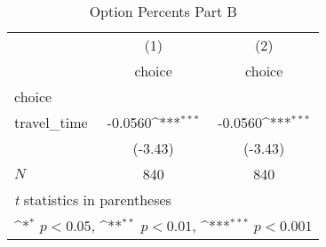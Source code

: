 \begin{table}[htbp]\centering
\def\sym#1{\ifmmode^{#1}\else\(^{#1}\)\fi}
\caption{Option Percents Part B}
\begin{tabular}{l*{2}{c}}
\hline\hline
            &\multicolumn{1}{c}{(1)}&\multicolumn{1}{c}{(2)}\\
            &\multicolumn{1}{c}{choice}&\multicolumn{1}{c}{choice}\\
\hline
choice      &                     &                     \\
travel\_time &     -0.0560\sym{***}&     -0.0560\sym{***}\\
            &     (-3.43)         &     (-3.43)         \\
\hline
\(N\)       &         840         &         840         \\
\hline\hline
\multicolumn{3}{l}{\footnotesize \textit{t} statistics in parentheses}\\
\multicolumn{3}{l}{\footnotesize \sym{*} \(p<0.05\), \sym{**} \(p<0.01\), \sym{***} \(p<0.001\)}\\
\end{tabular}
\end{table}
